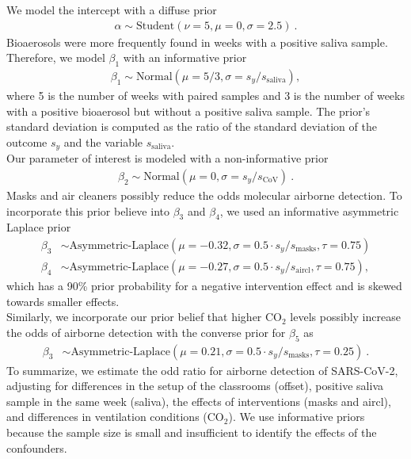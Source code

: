 \documentclass[fleqn,11pt]{wlscirep_supp}
\begin{document}
We model the intercept with a diffuse prior
\begin{align}
    \alpha \sim \text{Student}(\nu=5, \mu = 0, \sigma = 2.5) ~.
\end{align}
Bioaerosols were more frequently found in weeks with a positive saliva sample. Therefore, we model $\beta_1$ with an informative prior
\begin{align}
    \beta_1 \sim \text{Normal}(\mu = 5/3, \sigma = s_y / s_{\text{saliva}}),
\end{align}
where 5 is the number of weeks with paired samples and 3 is the number of weeks with a positive bioaerosol but without a positive saliva sample. The prior's standard deviation is computed as the ratio of the standard deviation of the outcome $s_y$ and the variable $s_{\text{saliva}}$. \\
Our parameter of interest is modeled with a non-informative prior
\begin{align}
    \beta_2 \sim \text{Normal}(\mu = 0, \sigma = s_y / s_\text{CoV})~.
\end{align}
Masks and air cleaners possibly reduce the odds molecular airborne detection. To incorporate this prior believe into $\beta_3$ and $\beta_4$, we used an informative asymmetric Laplace prior 
\begin{align}
    \beta_3 &\sim \text{Asymmetric-Laplace}(\mu = -0.32, \sigma = 0.5\cdot s_y / s_{\text{masks}}, \tau = 0.75) \\
    \beta_4 &\sim \text{Asymmetric-Laplace}(\mu = -0.27, \sigma = 0.5\cdot s_y / s_{\text{aircl}}, \tau = 0.75),
\end{align}
which has a 90\% prior probability for a negative intervention effect and is skewed towards smaller effects. \\
Similarly, we incorporate our prior belief that higher CO$_2$ levels possibly increase the odds of airborne detection with the converse prior for $\beta_5$ as
\begin{align}
    \beta_3 &\sim \text{Asymmetric-Laplace}(\mu = 0.21, \sigma = 0.5\cdot s_y / s_{\text{masks}}, \tau = 0.25)~.
\end{align}
To summarize, we estimate the odd ratio for airborne detection of SARS-CoV-2, adjusting for differences in the setup of the classrooms (offset), positive saliva sample in the same week (saliva), the effects of interventions (masks and aircl), and differences in ventilation conditions (CO$_2$). We use informative priors because the sample size is small and insufficient to identify the effects of the confounders. 

\clearpage
\end{document}
